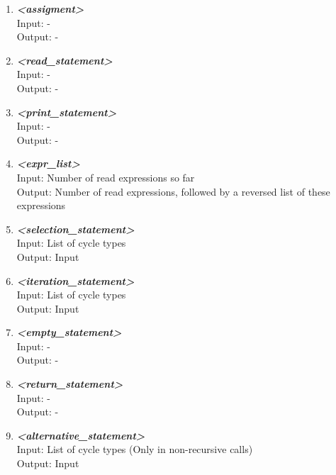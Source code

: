 \documentclass[a4paper, 11pt]{article}
\begin{document}
\begin{enumerate}
\item \textbf{\textit{<assigment>}} \\
Input: \hspace{3.288mm} - \\
Output: \enspace -

\item \textbf{\textit{<read\_statement>}} \\
Input: \hspace{3.288mm} - \\
Output: \enspace -

\item \textbf{\textit{<print\_statement>}} \\
Input: \hspace{3.288mm} - \\
Output: \enspace -

\item \textbf{\textit{<expr\_list>}} \\
Input: \hspace{3.288mm} Number of read expressions so far \\
Output: \enspace Number of read expressions, followed by a reversed list of these expressions

\item \textbf{\textit{<selection\_statement>}} \\
Input: \hspace{3.288mm} List of cycle types \\
Output: \enspace Input

\item \textbf{\textit{<iteration\_statement>}} \\
Input: \hspace{3.288mm} List of cycle types \\
Output: \enspace Input

\item \textbf{\textit{<empty\_statement>}} \\
Input: \hspace{3.288mm} - \\
Output: \enspace -

\item \textbf{\textit{<return\_statement>}} \\
Input: \hspace{3.288mm} - \\
Output: \enspace -

\item \textbf{\textit{<alternative\_statement>}} \\
Input: \hspace{3.288mm} List of cycle types (Only in non-recursive calls) \\
Output: \enspace Input


\end{enumerate}
\end{document}
